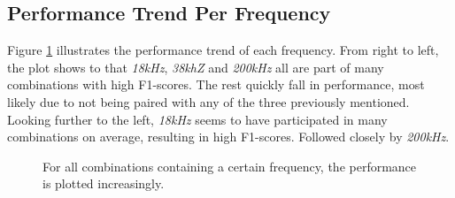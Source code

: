         
        
    \subsection{Performance Trend Per Frequency}
        Figure \ref{performance_trend_fig} illustrates the performance trend of each frequency. From right to left, the plot shows to that \textit{18kHz}, \textit{38khZ} and \textit{200kHz} all are part of many combinations with high F1-scores. The rest quickly fall in performance, most likely due to not being paired with any of the three previously mentioned. Looking further to the left, \textit{18kHz} seems to have participated in many combinations on average, resulting in high F1-scores. Followed closely by \textit{200kHz}.
        \begin{figure}[H]
            \centering
            
            \caption[Performance trend per frequency]{For all combinations containing a certain frequency, the performance is plotted increasingly.}
          	\medskip 
            \label{performance_trend_fig}
        \end{figure}
    

    
    
